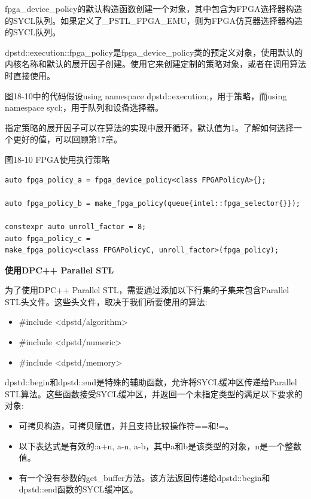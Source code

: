 fpga\_device\_policy的默认构造函数创建一个对象，其中包含为FPGA选择器构造的SYCL队列。如果定义了\_PSTL\_FPGA\_EMU，则为FPGA仿真器选择器构造的SYCL队列。\par

dpstd::execution::fpga\_policy是fpga\_device\_policy类的预定义对象，使用默认的内核名称和默认的展开因子创建。使用它来创建定制的策略对象，或者在调用算法时直接使用。\par

图18-10中的代码假设using namespace dpstd::execution;，用于策略，而using namespace sycl;，用于队列和设备选择器。\par

指定策略的展开因子可以在算法的实现中展开循环，默认值为1。了解如何选择一个更好的值，可以回顾第17章。\par

\hspace*{\fill} \par %
图18-10 FPGA使用执行策略
\begin{lstlisting}[caption={}]
auto fpga_policy_a = fpga_device_policy<class FPGAPolicyA>{};

auto fpga_policy_b = make_fpga_policy(queue{intel::fpga_selector{}});

constexpr auto unroll_factor = 8;
auto fpga_policy_c = 
make_fpga_policy<class FPGAPolicyC, unroll_factor>(fpga_policy);
\end{lstlisting}

\hspace*{\fill} \par %
\textbf{使用DPC++ Parallel STL}

为了使用DPC++ Parallel STL，需要通过添加以下行集的子集来包含Parallel STL头文件。这些头文件，取决于我们所要使用的算法:\par

\begin{itemize}
	\item \#include <dpstd/algorithm>
	\item \#include <dpstd/numeric>
	\item \#include <dpstd/memory>
\end{itemize}

dpstd::begin和dpstd::end是特殊的辅助函数，允许将SYCL缓冲区传递给Parallel STL算法。这些函数接受SYCL缓冲区，并返回一个未指定类型的满足以下要求的对象:\par

\begin{itemize}
	\item 可拷贝构造，可拷贝赋值，并且支持比较操作符==和!=。
	\item 以下表达式是有效的:a+n, a-n, a-b，其中a和b是该类型的对象，n是一个整数值。
	\item 有一个没有参数的get\_buffer方法。该方法返回传递给dpstd::begin和dpstd::end函数的SYCL缓冲区。
\end{itemize}

